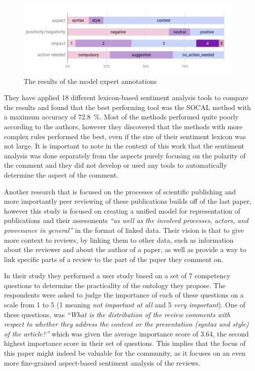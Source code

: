    \begin{figure}[htbp!]\centering
\includegraphics[width=.66\textwidth]{img/nano_annotations}
      \caption[The results of the model expert annotations]{The results of the model expert annotations \cite{nano_peer}}\label{img:annotations}
    \end{figure}
They have applied 18 different lexicon-based sentiment analysis tools to compare the results and found that the best performing tool was the SOCAL method \cite{socal} with a maximum accuracy of 72.8~\%. Most of the methods performed quite poorly according to the authors, however they discovered that the methods with more complex rules performed the best, even if the size of their sentiment lexicon was not large. It is important to note in the context of this work that the sentiment analysis was done separately from the aspects purely focusing on the polarity of the comment and they did not develop or used any tools to automatically determine the aspect of the comment.

Another research that is focused on the processes of scientific publishing and more importantly peer reviewing of these publications builds off of the last paper, however this study is focused on creating a unified model for representation of publications and their assessments \textit{``as well as the involved processes, actors, and provenance in general''} \cite[p. 1]{nanopublications} in the format of linked data. Their vision is that to give more context to reviews, by linking them to other data, such as information about the reviewer and about the author of a paper, as well as provide a way to link specific parts of a review to the part of the paper they comment on.

In their study they performed a user study based on a set of 7 competency questions to determine the practicality of the ontology they propose. The respondents were asked to judge the importance of each of these questions on a scale from 1 to 5 (1 meaning \textit{not important at all} and 5 \textit{very important}). One of these questions,  was \textit{``What is the distribution of the review comments with respect to whether
they address the content or the presentation (syntax and style) of the article?''} which was given the average importance score of 3.64, the second highest importance score in their set of questions. This implies  that the focus of this paper might indeed be valuable for the community, as it focuses on an even more fine-grained aspect-based sentiment analysis of the reviews.
